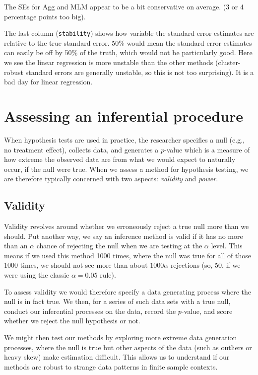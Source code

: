 \documentclass[
]{book}
\begin{document}
The SEs for Agg and MLM appear to be a bit conservative on average. (3 or 4 percentage points too big).

The last column (\texttt{stability}) shows how variable the standard error estimates are relative to the true standard error.
50\% would mean the standard error estimates can easily be off by 50\% of the truth, which would not be particularly good.
Here we see the linear regression is more unstable than the other methods (cluster-robust standard errors are generally unstable, so this is not too surprising).
It is a bad day for linear regression.

\hypertarget{assessing-an-inferential-procedure}{%
\section{Assessing an inferential procedure}\label{assessing-an-inferential-procedure}}

When hypothesis tests are used in practice, the researcher specifies a null (e.g., no treatment effect), collects data, and generates a \(p\)-value which is a measure of how extreme the observed data are from what we would expect to naturally occur, if the null were true.
When we assess a method for hypothesis testing, we are therefore typically concerned with two aspects: \emph{validity} and \emph{power}.

\hypertarget{validity}{%
\subsection{Validity}\label{validity}}

Validity revolves around whether we erroneously reject a true null more than we should.
Put another way, we say an inference method is valid if it has no more than an \(\alpha\) chance of rejecting the null when we are testing at the \(\alpha\) level.
This means if we used this method 1000 times, where the null was true for all of those 1000 times, we should not see more than about \(1000 \alpha\) rejections (so, 50, if we were using the classic \(\alpha = 0.05\) rule).

To assess validity we would therefore specify a data generating process where the null is in fact true.
We then, for a series of such data sets with a true null, conduct our inferential processes on the data, record the \(p\)-value, and score whether we reject the null hypothesis or not.

We might then test our methods by exploring more extreme data generation processes, where the null is true but other aspects of the data (such as outliers or heavy skew) make estimation difficult.
This allows us to understand if our methods are robust to strange data patterns in finite sample contexts.
\end{document}
